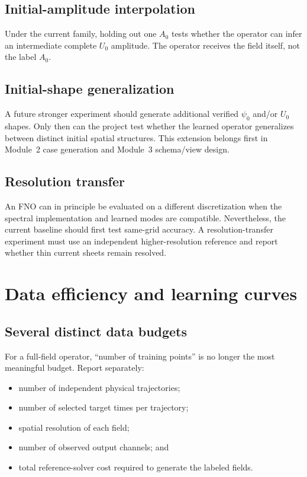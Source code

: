 \documentclass[11pt]{article}
\begin{document}
\subsection{Initial-amplitude interpolation}
Under the current family, holding out one $A_0$ tests whether the operator can infer an intermediate complete $U_0$ amplitude. The operator receives the field itself, not the label $A_0$.

\subsection{Initial-shape generalization}
A future stronger experiment should generate additional verified $\psi_0$ and/or $U_0$ shapes. Only then can the project test whether the learned operator generalizes between distinct initial spatial structures. This extension belongs first in Module~2 case generation and Module~3 schema/view design.

\subsection{Resolution transfer}
An FNO can in principle be evaluated on a different discretization when the spectral implementation and learned modes are compatible. Nevertheless, the current baseline should first test same-grid accuracy. A resolution-transfer experiment must use an independent higher-resolution reference and report whether thin current sheets remain resolved.

\section{Data efficiency and learning curves}
\label{sec:dataeff}

\subsection{Several distinct data budgets}
For a full-field operator, ``number of training points'' is no longer the most meaningful budget. Report separately:
\begin{itemize}
  \item number of independent physical trajectories;
  \item number of selected target times per trajectory;
  \item spatial resolution of each field;
  \item number of observed output channels; and
  \item total reference-solver cost required to generate the labeled fields.
\end{itemize}
\end{document}
